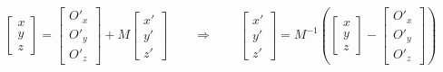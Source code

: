 \documentclass{article}
\begin{document}
\thispagestyle{empty}

$$
 \begin{bmatrix}x \\ y \\ z\end{bmatrix} = 
\begin{bmatrix}O'_x \\ O'_y \\ O'_z\end{bmatrix} + 
 M \begin{bmatrix}x' \\ y' \\ z'\end{bmatrix} 
 \qquad\Rightarrow\qquad
 \begin{bmatrix}x' \\ y' \\ z'\end{bmatrix}  =
M^{-1}\left( \begin{bmatrix}x \\ y \\ z\end{bmatrix} - \begin{bmatrix}O'_x \\ O'_y \\ O'_z\end{bmatrix}\right)
$$
\end{document}
